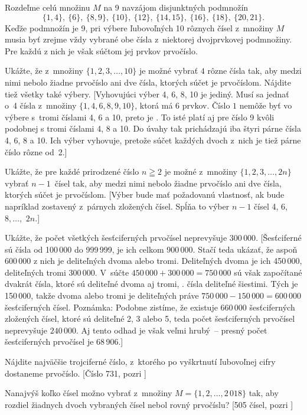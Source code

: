 {Rozdeľme celú množinu $M$ na 9 navzájom disjunktných podmnožín
$$
\{1,4\},~\{6\},~\{8,9\},~\{10\},~\{12\},~\{14,15\},~
\{16\},~\{18\},~\{20,21\}.
$$
Keďže podmnožín je 9, pri výbere ľubovoľných 10 rôznych čísel
z~množiny $M$ musia byť zrejme vždy vybrané obe čísla z~niektorej
dvojprvkovej podmnožiny. Pre každú z nich je však súčtom jej
prvkov prvočíslo.

Ukážte, že z~množiny $\{1,2,3,\dots,10\}$ je možné vybrať $4$ rôzne
čísla tak, aby medzi nimi nebolo žiadne prvočíslo ani dve čísla,
ktorých súčet je prvočíslom. Nájdite tiež všetky také výbery.
[Vyhovujúci výber 4, 6, 8, 10 je jediný. Musí sa jednať o~4 čísla
z~množiny $\{1, 4, 6, 8, 9, 10\}$, ktorá má 6 prvkov.
Číslo $1$ nemôže byť
vo výbere s~tromi číslami 4, 6 a 10, preto je .
To isté platí aj pre číslo 9 kvôli podobnej 
s tromi číslami 4, 8 a 10. Do úvahy tak prichádzajú iba štyri párne
čísla 4, 6, 8 a 10. Ich výber vyhovuje, pretože súčet každých
dvoch z~nich je tiež párne číslo rôzne od~2.]


Ukážte, že pre každé prirodzené číslo $n\geqq2$ je možné
z~množiny $\{1,2,3,\dots,2n\}$ vybrať $n-1$~čísel tak, aby medzi nimi
nebolo žiadne prvočíslo ani dve čísla, ktorých súčet je prvočíslom.
[Výber bude mať požadovanú vlastnosť, ak bude napríklad zostavený
z~párnych zložených čísel. Spĺňa to výber $n-1$ čísel
4, 6, $8, \dots,$ $2n$.]

\D
Ukážte, že počet všetkých šesťciferných prvočísel neprevyšuje $300\,000$.
[Šesťciferné sú čísla od 100\,000 do 999\,999, je ich celkom
900\,000. Stačí teda ukázať, že aspoň 600\,000 z nich je
deliteľných dvoma alebo tromi. Deliteľných dvoma je ich 450\,000,
deliteľných tromi 300\,000. V~súčte $450\,000+300\,000=750\,000$
sú však započítané dvakrát čísla, ktoré sú deliteľné dvoma
aj tromi, \tj. čísla deliteľné šiestimi. Tých je 150\,000, takže dvoma alebo
tromi je deliteľných práve $750\,000-150\,000=600\,000$ šesťciferných
čísel. Poznámka: Podobne zistíme, že existuje 660\,000
šesťciferných zložených čísel, ktoré sú deliteľné 2, 3 alebo 5,
teda počet šesťciferných prvočísel neprevyšuje $240\,000$.
Aj tento odhad je však veľmi hrubý~-- presný počet
šesťciferných prvočísel je 68\,906.]

Nájdite najväčšie trojciferné číslo, z~ktorého po vyškrtnutí
ľubovoľnej cifry dostaneme prvočíslo. [Číslo 731, pozri ]

Nanajvýš koľko čísel možno vybrať z~množiny
$M=\{1,2,\dots,2\,018\}$ tak, aby rozdiel žiadnych dvoch vybraných čísel
nebol rovný prvočíslu?
[505 čísel, pozri ]
}


